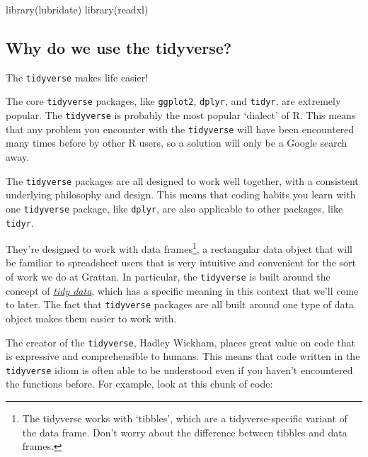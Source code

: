 \documentclass[
]{book}
\newenvironment{Shaded}{\begin{snugshade}}{\end{snugshade}}
\newcommand{\FunctionTok}[1]{\textcolor[rgb]{0.00,0.00,0.00}{#1}}
\newcommand{\NormalTok}[1]{#1}
\begin{document}
\begin{Shaded}
\begin{Highlighting}[]
\FunctionTok{library}\NormalTok{(lubridate)}
\FunctionTok{library}\NormalTok{(readxl)}
\end{Highlighting}
\end{Shaded}

\hypertarget{why-do-we-use-the-tidyverse}{%
\subsection{Why do we use the tidyverse?}\label{why-do-we-use-the-tidyverse}}

The \texttt{tidyverse} makes life easier!

The core \texttt{tidyverse} packages, like \texttt{ggplot2}, \texttt{dplyr}, and \texttt{tidyr}, are extremely popular. The \texttt{tidyverse} is probably the most popular `dialect' of R. This means that any problem you encounter with the \texttt{tidyverse} will have been encountered many times before by other R users, so a solution will only be a Google search away.

The \texttt{tidyverse} packages are all designed to work well together, with a consistent underlying philosophy and design. This means that coding habits you learn with one \texttt{tidyverse} package, like \texttt{dplyr}, are also applicable to other packages, like \texttt{tidyr}.

They're designed to work with data frames\footnote{The tidyverse works with `tibbles', which are a tidyverse-specific variant of the data frame. Don't worry about the difference between tibbles and data frames.}, a rectangular data object that will be familiar to spreadsheet users that is very intuitive and convenient for the sort of work we do at Grattan. In particular, the \texttt{tidyverse} is built around the concept of \href{https://cran.r-project.org/web/packages/tidyr/vignettes/tidy-data.html}{\emph{tidy data}}, which has a specific meaning in this context that we'll come to later. The fact that \texttt{tidyverse} packages are all built around one type of data object makes them easier to work with.

The creator of the \texttt{tidyverse}, Hadley Wickham, places great value on code that is expressive and comprehensible to humans. This means that code written in the \texttt{tidyverse} idiom is often able to be understood even if you haven't encountered the functions before. For example, look at this chunk of code:
\end{document}
